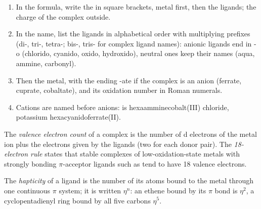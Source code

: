 \begin{method}\label{met:b2:coordination-complexes:naming}
\begin{enumerate}
  \item In the formula, write the  in square brackets, metal
        first, then the ligands; the charge of the complex outside.
  \item In the name, list the ligands in alphabetical order with multiplying
        prefixes (di-, tri-, tetra-; bis-, tris- for complex ligand names): anionic
        ligands end in -o (chlorido, cyanido, oxido, hydroxido), neutral ones keep
        their names (aqua, ammine, carbonyl).
  \item Then the metal, with the ending -ate if the complex is an anion (ferrate,
        cuprate, cobaltate), and its oxidation number in Roman numerals.
  \item Cations are named before anions:  is
        hexaamminecobalt(III) chloride,  potassium
        hexacyanidoferrate(II).
\end{enumerate}
\end{method}

\begin{definition}\label{def:b2:coordination-complexes:electron-count}
The \emph{valence electron count} of a complex is the
number of d electrons of the metal ion plus the electrons given by the ligands (two
for each donor pair). The \emph{18-electron rule} states that
stable complexes of low-oxidation-state metals with strongly bonding $\pi$-acceptor
ligands such as  tend to have 18 valence electrons.
\end{definition}

\begin{definition}[Hapticity]\label{def:b2:coordination-complexes:hapticity}
The \emph{hapticity} of a ligand is the number of its atoms bound to
the metal through one continuous $\pi$ system; it is written $\eta^n$: an ethene bound by
its $\pi$ bond is $\eta^2$, a cyclopentadienyl ring bound by all five carbons $\eta^5$.
\end{definition}

